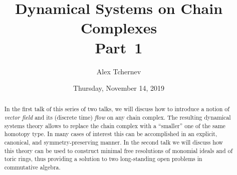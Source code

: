 \documentclass{UAmathtalk}
\author{Alex Tchernev}
\title{Dynamical Systems on Chain Complexes\\ Part~1}
\date{Thursday, November 14, 2019}
\begin{document}
\maketitle

\begin{abstract}
In the first talk of this series of two talks, we will discuss how to introduce a notion of \emph{vector field} and its (discrete time) \emph{flow} on any chain complex. The resulting dynamical systems theory allows to replace the chain complex with a “smaller” one of the same homotopy type. In many cases of interest this can be accomplished in an explicit, canonical, and symmetry-preserving manner. In the second talk we will discuss how this theory can be used to construct minimal free resolutions of monomial ideals and of toric rings, thus providing a solution to two long-standing open problems in commutative algebra.
\end{abstract}
\end{document}
